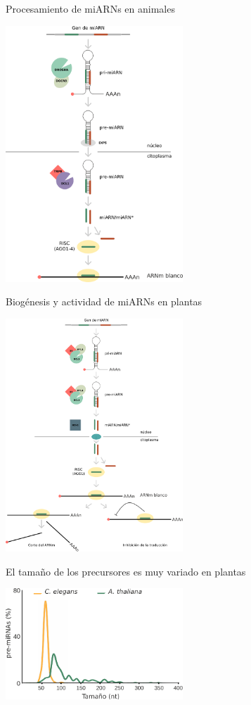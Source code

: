\documentclass{beamer}
\begin{document}
\begin{frame}{Procesamiento de miARNs en animales}
	\begin{center}
		\includegraphics[width=0.5\textwidth]{img/procesamiento_animales.png}
	\end{center}
\end{frame}

\begin{frame}{Biogénesis y actividad de miARNs en plantas}
	\begin{center}
		\includegraphics[width=0.5\textwidth]{img/biogenesis_accion.png}
	\end{center}
\end{frame}

\begin{frame}{El tamaño de los precursores es muy variado en plantas}
	\begin{center}
		\includegraphics[width=0.5\textwidth]{img/distribucion_precursores.png}
	\end{center}
\end{frame}
\end{document}
